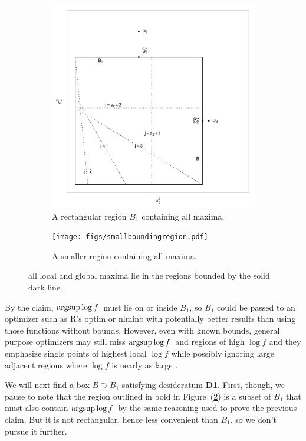 \documentclass{report}
\newcommand{\textcompute}{\textsf}
\newcommand{\R}{\textcompute{R}\xspace}
\newcommand{\RL}{f}
\newcommand{\logRL}{\log\RL}
\newcommand{\mrle}{$\argsup\log f$}
\newcommand{\argsup}{\operatornamewithlimits{argsup}}
\begin{document}
\begin{figure}[h]
  \begin{subfigure}{.5\textwidth}
	\centering
	\includegraphics[width=.8\linewidth]{figs/boundingbox.pdf}
	\caption{A rectangular region $B_1$ containing all maxima.}
	\label{fig:bigboundingbox}
  \end{subfigure}
  \begin{subfigure}{.5\textwidth}
	\centering
	\texttt{[image: figs/smallboundingregion.pdf]}
	\caption{A smaller region containing all maxima.}
	\label{fig:smallboundingbox}
  \end{subfigure}
  \caption{all local and global maxima lie in the regions bounded by the solid
                dark line.
               }
  \label{fig:boundingbox}
\end{figure}

By the claim, \mrle\ must lie on or inside $B_1$, so $B_1$ could be passed to an optimizer such as \R's \textsf{optim} or \textsf{nlminb} with potentially better results than using those functions without bounds.  However, even with known bounds, general purpose optimizers may still miss \mrle\ and regions of high $\logRL$ and they emphasize single points of highest local $\logRL$ while possibly ignoring large adjacent regions where $\logRL$ is nearly as large \citep{hill:1965, hodges:2013}.

We will next find a box $B \supset B_1$ satisfying desideratum \textbf{D1}.  First, though, we pause to note that the region outlined in bold in Figure~(\ref{fig:smallboundingbox}) is a subset of $B_1$ that must also contain \mrle\ by the same reasoning used to prove the previous claim.  But it is not rectangular, hence less convenient than $B_1$, so we don't pursue it further.\\[5pt]
\end{document}
